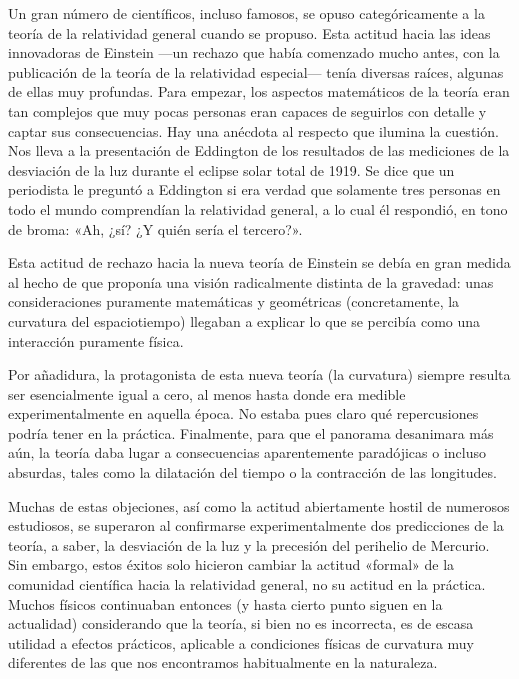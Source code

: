 Un gran número de científicos, incluso famosos, se opuso categóricamente a la
teoría de la relatividad general cuando se propuso. Esta actitud hacia las ideas
innovadoras de Einstein ---un rechazo que había comenzado mucho antes, con la
publicación de la teoría de la relatividad especial---
tenía diversas raíces, algunas de ellas muy profundas. Para empezar, los aspectos
matemáticos de la teoría eran tan complejos que muy pocas personas eran capaces de
seguirlos con detalle y captar sus consecuencias. Hay una anécdota al respecto que
ilumina la cuestión. Nos lleva a la presentación de Eddington
de los resultados de las mediciones de la desviación de la luz durante el eclipse
solar total de 1919. Se dice que un periodista le preguntó a
Eddington si era verdad que solamente tres personas en
todo el mundo comprendían la relatividad general, a lo
cual él respondió, en tono de broma: «Ah, ¿sí? ¿Y quién sería el tercero?».

Esta actitud de rechazo hacia la nueva teoría de Einstein se debía en gran medida
al hecho de que proponía una visión radicalmente distinta de la gravedad: unas
consideraciones puramente matemáticas y geométricas (concretamente, la curvatura
del espaciotiempo) llegaban a explicar lo que se percibía como una interacción
puramente física.

Por añadidura, la protagonista de esta nueva teoría (la curvatura) siempre resulta
ser esencialmente igual a cero, al menos hasta donde era medible experimentalmente
en aquella época. No estaba pues claro qué repercusiones podría tener en la
práctica. Finalmente, para que el panorama desanimara más aún, la teoría daba lugar
a consecuencias aparentemente paradójicas o incluso absurdas, tales como la
dilatación del tiempo o la contracción de las longitudes.

Muchas de estas objeciones, así como la actitud abiertamente hostil de numerosos
estudiosos, se superaron al confirmarse experimentalmente dos predicciones de la
teoría, a saber, la desviación de la luz y la precesión del
perihelio de Mercurio. Sin embargo, estos éxitos solo hicieron
cambiar la actitud «formal» de la comunidad científica hacia la relatividad
general, no su actitud en la práctica. Muchos físicos continuaban entonces (y
hasta cierto punto siguen en la actualidad) considerando que la teoría, si bien
no es incorrecta, es de escasa utilidad a efectos prácticos, aplicable a
condiciones físicas de curvatura muy diferentes de las que nos encontramos
habitualmente en la naturaleza.


